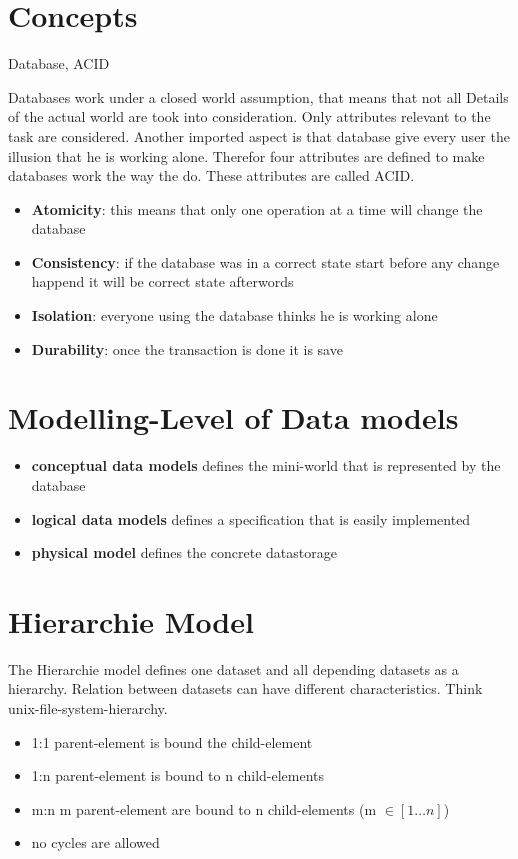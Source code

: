 \section{Concepts}
\begin{keywords}
Database, ACID
\end{keywords}
Databases work under a closed world assumption, that means that not all Details
of the actual world are took into consideration. Only attributes relevant to the
task are considered. Another imported aspect is that database give every user
the illusion that he is working alone. Therefor four attributes are defined to
make databases work the way the do. These attributes are called ACID.
\begin{itemize}
\setlength{\itemsep}{1pt}
	\item \textbf{Atomicity}: this means that only one operation at a time will change
the database
	\item \textbf{Consistency}: if the database was in a correct state start before any change
happend it will be correct state afterwords
	\item \textbf{Isolation}: everyone using the database thinks he is working alone
	\item \textbf{Durability}: once the transaction is done it is save
\end{itemize}

\section{Modelling-Level of Data models}
\begin{itemize}
\setlength{\itemsep}{1pt}
	\item \textbf{conceptual data models} defines the mini-world that is
represented by the database
	\item \textbf{logical data models} defines a specification that is easily
implemented
	\item \textbf{physical model} defines the concrete datastorage
\end{itemize}

\section{Hierarchie Model}
The Hierarchie model defines one dataset and all depending datasets as a
hierarchy. Relation between datasets can have different characteristics.
Think unix-file-system-hierarchy.
\begin{itemize}
\setlength{\itemsep}{1pt}
	\item 1:1 parent-element is bound the child-element
	\item 1:n parent-element is bound to n child-elements
	\item m:n m parent-element are bound to n child-elements
(m $\in [1 \dots n]$)
	\item no cycles are allowed
\end{itemize}

